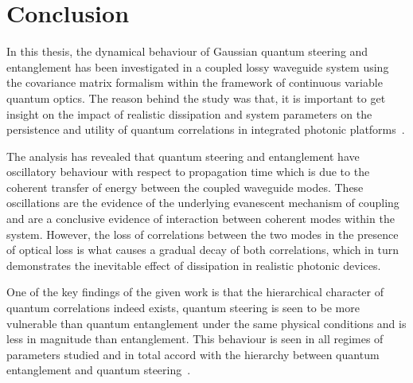 
\chapter{Conclusion}
\label{chp5}

In this thesis, the dynamical behaviour of Gaussian quantum steering and entanglement has been investigated in a coupled lossy waveguide system using the covariance matrix formalism within the framework of continuous variable quantum optics. The reason behind the study was that, it is important to get insight on the impact of realistic dissipation and system parameters on the persistence and utility of quantum correlations in integrated photonic platforms~\cite{Weedbrook2012,Kogias2015,Seifoory2019}.

The analysis has revealed that quantum steering and entanglement have oscillatory behaviour with respect to propagation time which is due to the coherent transfer of energy between the coupled waveguide modes. These oscillations are the evidence of the underlying evanescent mechanism of coupling and are a conclusive evidence of interaction between coherent modes within the system. However, the loss of correlations between the two modes in the presence of optical loss is what causes a gradual decay of both correlations, which in turn demonstrates the inevitable effect of dissipation in realistic photonic devices.

One of the key findings of the given work is that the hierarchical character of quantum correlations indeed exists, quantum steering is seen to be more vulnerable than quantum entanglement under the same physical conditions and is less in magnitude than entanglement. This behaviour is seen in all regimes of parameters studied and in total accord with the hierarchy between quantum entanglement and quantum steering~\cite{WisemanJonesDoherty2007,Fan2023}.

